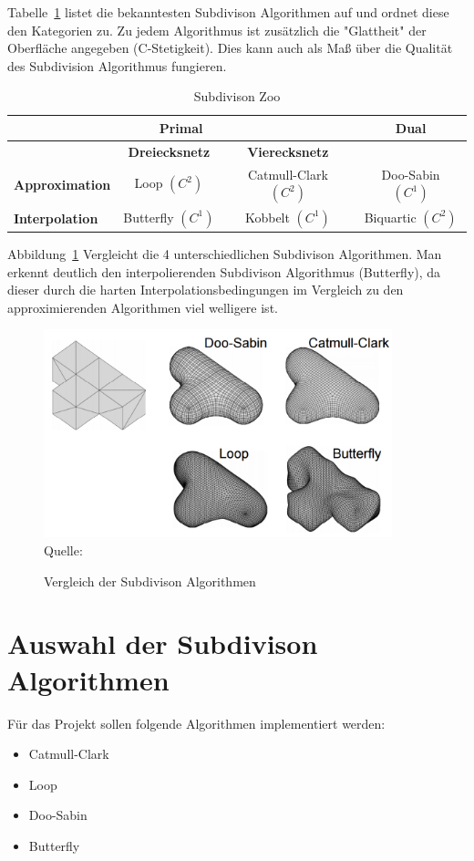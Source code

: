 Tabelle~\ref{tab:sd_comp} listet die bekanntesten Subdivison Algorithmen auf und ordnet diese den Kategorien zu.
Zu jedem Algorithmus ist zusätzlich die "Glattheit" der Oberfläche angegeben (C-Stetigkeit).
Dies kann auch als Maß über die Qualität des Subdivision Algorithmus fungieren.
\begin{table}[h]
\caption{Subdivison Zoo}
\center
\begin{tabular}{l|c|c|c}
\toprule
\multicolumn{3}{c|}{\textbf{Primal}} & \textbf{Dual}\\
\midrule
& \textbf{Dreiecksnetz} & \textbf{Vierecksnetz} & \\
\midrule
\textbf{Approximation} & Loop \((C^2)\) & Catmull-Clark \((C^2)\) & Doo-Sabin \((C^1)\) \\
\textbf{Interpolation} & Butterfly \((C^1)\) & Kobbelt \((C^1)\) & Biquartic \((C^2)\) \\
\bottomrule
\end{tabular}
\label{tab:sd_comp}
\end{table}

Abbildung~\ref{fig:sd_comp} Vergleicht die 4 unterschiedlichen Subdivison Algorithmen.
Man erkennt deutlich den interpolierenden Subdivison Algorithmus (Butterfly),
da dieser durch die harten Interpolationsbedingungen im Vergleich zu den approximierenden Algorithmen viel welligere ist.
\begin{figure}[h]
  \caption{Vergleich der Subdivison Algorithmen}
  \centering
  \includegraphics[width=0.9\textwidth]{content/media/sd_overview.png}
  \\Quelle: \cite{Standford.24.07.2015}
  \label{fig:sd_comp}
\end{figure}

\section{Auswahl der Subdivison Algorithmen}

Für das Projekt sollen folgende Algorithmen implementiert werden:
\begin{itemize}
	\item Catmull-Clark
	\item Loop
	\item Doo-Sabin
	\item Butterfly
\end{itemize}



